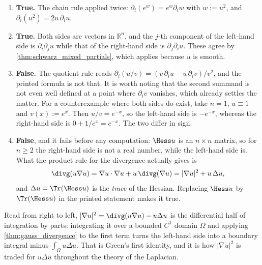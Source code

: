\begin{exercisesolution}
\label{sol:differential_identities_true_false}
\begin{enumerate}[label=\textbf{(\alph*)}]
  \item \textbf{True.} The chain rule applied twice: $\partial_i(e^{w}) = e^{w}\partial_i w$ with
    $w := u^2$, and $\partial_i(u^2) = 2u\,\partial_i u$.
  \item \textbf{True.} Both sides are vectors in $\mathbb{R}^n$, and the $j$-th component of the
    left-hand side is $\partial_i\partial_j u$ while that of the right-hand side is
    $\partial_j\partial_i u$. These agree by \cref{thm:schwarz_mixed_partials}, which applies
    because $u$ is smooth.
  \item \textbf{False.} The quotient rule reads
    $\partial_i(u/v) = (v\,\partial_i u - u\,\partial_i v)/v^2$, and the printed formula is not
    that. It is worth noting that the second summand is not even well defined at a point where
    $\partial_i v$ vanishes, which already settles the matter. For a counterexample where both
    sides do exist, take $n = 1$, $u \equiv 1$ and $v(x) := e^{x}$. Then $u/v = e^{-x}$, so the
    left-hand side is $-e^{-x}$, whereas the right-hand side is $0 + 1/e^{x} = e^{-x}$. The two
    differ in sign.
  \item \textbf{False}, and it fails before any computation: $\Hess u$ is an $n\times n$ matrix,
    so for $n \geq 2$ the right-hand side is not a real number, while the left-hand side is. What
    the product rule for the divergence actually gives is
    \[\divg(u\nabla u) = \nabla u \cdot \nabla u + u\,\divg(\nabla u)
      = \lvert\nabla u\rvert^2 + u\,\Delta u ,\]
    and $\Delta u = \Tr(\Hess u)$ is the \emph{trace} of the Hessian. Replacing $\Hess u$ by
    $\Tr(\Hess u)$ in the printed statement makes it true.
\end{enumerate}

\begin{remark}
Read from right to left, $\lvert\nabla u\rvert^2 = \divg(u\nabla u) - u\Delta u$ is the
differential half of integration by parts: integrating it over a bounded $C^1$ domain $\Omega$
and applying \cref{thm:gauss_divergence} to the first term turns the left-hand side into a
boundary integral minus $\int_\Omega u\Delta u$. That is Green's first identity, and it is how
$\lvert\nabla u\rvert^2$ is traded for $u\Delta u$ throughout the theory of the Laplacian.
\end{remark}
\end{exercisesolution}

